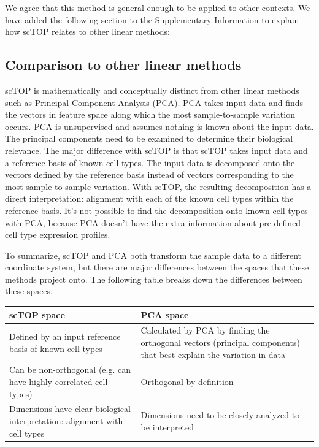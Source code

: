 \documentclass[12pt,american]{scrartcl}
\begin{document}
\begin{revresponse}
	We agree that this method is general enough to be applied to other contexts. We have added the following section to the Supplementary Information to explain how scTOP relates to other linear methods:
	\begin{changes}
		\subsection*{Comparison to other linear methods}
          scTOP is mathematically and conceptually distinct from other linear methods such as Principal Component Analysis (PCA). PCA takes input data and finds the vectors in feature space along which the most sample-to-sample variation occurs. PCA is unsupervised and assumes nothing is known about the input data. The principal components need to be examined to determine their biological relevance. The major difference with scTOP is that scTOP takes input data and a reference basis of known cell types. The input data is decomposed onto the vectors defined by the reference basis instead of vectors corresponding to the most sample-to-sample variation. With scTOP, the resulting decomposition has a direct interpretation: alignment with each of the known cell types within the reference basis. It’s not possible to find the decomposition onto known cell types with PCA, because PCA doesn’t have the extra information about pre-defined cell type expression profiles. 

          To summarize, scTOP and PCA both transform the sample data to a different coordinate system, but there are major differences between the spaces that these methods project onto. The following table breaks down the differences between these spaces.

          \begin{tabular}{ |p{2.5in}|p{2.5in}|} 
             \hline
             scTOP space & PCA space\\ 
             \hline
             \hline
             Defined by an input reference basis of known cell types & Calculated by PCA by finding the orthogonal vectors (principal components) that best explain the variation in data  \\ 
             \hline
             Can be non-orthogonal (e.g. can have highly-correlated cell types) & Orthogonal by definition  \\ 
             \hline
             Dimensions have clear biological interpretation: alignment with cell types & Dimensions need to be closely analyzed to be interpreted \\
             \hline
         \end{tabular}
	\end{changes}
\end{revresponse} \label{PCA}
\end{document}
